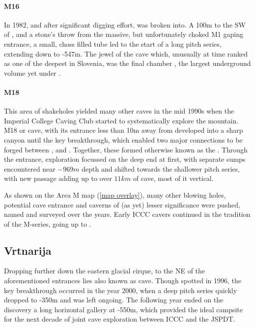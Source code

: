 \paragraph{M16} In 1982, and after significant digging effort,  was broken into. A 100m to the SW of , and a stone's throw from the massive, but unfortunately choked M1 gaping entrance, a small, choss filled tube led to the start of a long pitch series, extending down to -547m. The jewel of the cave which, unusually at time ranked as one of the deepest in Slovenia, was the final chamber , the largest underground volume yet under . 



\paragraph{M18} This area of shakeholes yielded many other caves in the mid 1990s when the Imperial College Caving Club started to systematically explore the mountain. M18 or  cave, with its entrance less than 10m away from  developed into a sharp canyon until the key  breakthrough, which enabled two major connections to be forged between ,  and . Together, these formed  otherwise known as the . Through the  entrance, exploration focussed on the deep end at first, with separate sumps encountered near $-969m$ depth and shifted towards the shallower pitch series, with new passage adding up to over $11km$ of cave, most of it vertical.

As shown on the Area M map (\vref{map overlay}), many other blowing holes, potential cave entrance and caverns of (as yet) lesser significance were pushed, named and surveyed over the years. Early ICCC cavers continued in the tradition of the M-series, going up to . 

\subsection{Vrtnarija} Dropping further down the eastern glacial cirque, to the NE of the aforementioned entrances lies  also known as   cave. Though spotted in 1996, the key breakthrough occurred in the year 2000, when a deep pitch series quickly dropped to -350m and was left ongoing. The following year ended on the discovery a long horizontal gallery at -550m, which provided the ideal campsite for the next decade of joint cave exploration between ICCC and the JSPDT. 

